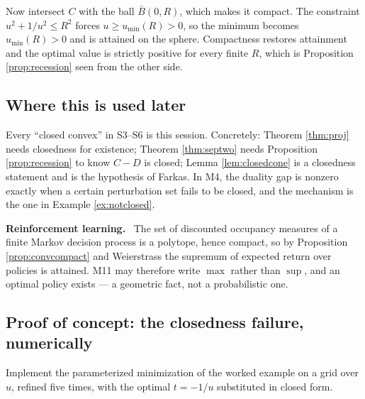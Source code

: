 \documentclass[11pt,a4paper]{article}
\newcommand{\mpart}[1]{\smallskip\noindent\textbf{#1}\ \ignorespaces}
\theoremstyle{definition}
\theoremstyle{plain}
\theoremstyle{remark}
\begin{document}
Now intersect $C$ with the ball $\bar B(0,R)$, which makes it compact. The constraint
$u^2+1/u^2\le R^2$ forces $u\ge u_{\min}(R)>0$, so the minimum becomes $u_{\min}(R)>0$ and is
attained on the sphere. Compactness restores attainment and the optimal value is strictly
positive for every finite $R$, which is Proposition \ref{prop:recession} seen from the other
side.

\subsection*{Where this is used later}

Every ``closed convex'' in S3--S6 is this session. Concretely: Theorem \ref{thm:proj} needs
closedness for existence; Theorem \ref{thm:septwo} needs Proposition \ref{prop:recession} to
know $C-D$ is closed; Lemma \ref{lem:closedcone} is a closedness statement and is the hypothesis
of Farkas. In M4, the duality gap is nonzero exactly when a certain perturbation set fails to be
closed, and the mechanism is the one in Example \ref{ex:notclosed}.

\mpart{Reinforcement learning.} The set of discounted occupancy measures of a finite Markov
decision process is a polytope, hence compact, so by Proposition \ref{prop:convcompact} and
Weierstrass the supremum of expected return over policies is attained. M11 may therefore write
$\max$ rather than $\sup$, and an optimal policy exists --- a geometric fact, not a
probabilistic one.

\subsection*{Proof of concept: the closedness failure, numerically}

Implement the parameterized minimization of the worked example on a grid over $u$, refined five
times, with the optimal $t=-1/u$ substituted in closed form.
\end{document}

